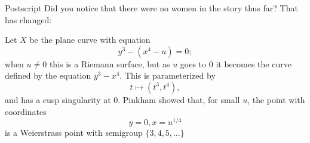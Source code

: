 \documentclass[11pt, aspectratio=43]{beamer}
\begin{document}
\begin{frame}{Postscript} 
Did you notice that there were no women in the story thus far? That has changed: 
\bigskip
{}

\end{frame}

\begin{frame}

\begin{example}[Pinkham, 1974]
Let $X$ be the plane curve with equation $$y^3-(x^4 -u) = 0;$$ when $u\neq 0$ this is a Riemann surface, but as $u$ goes to 0 it becomes the curve 
defined by the equation $y^3-x^4$. This is parameterized by $$t\mapsto (t^3, t^4),$$ and has a cusp singularity at 0. Pinkham showed that, for small $u$, the
point with coordinates $$y=0, x=u^{1/4}$$ is a Weierstrass point with 
semigroup $\{3,4,5,\dots\}$
\end{example}
\end{frame}
\end{document}
